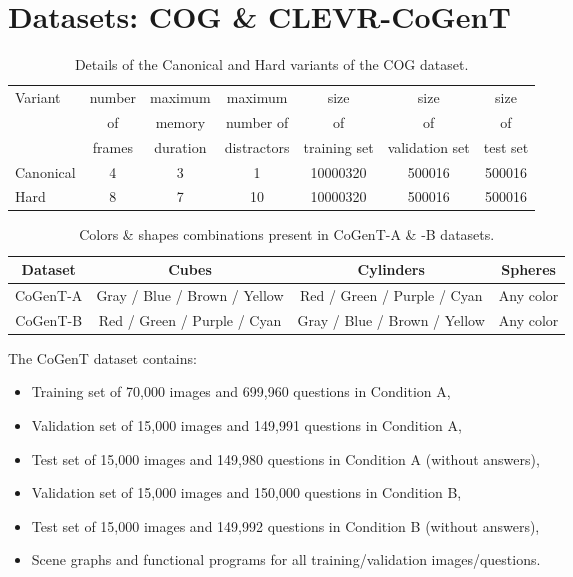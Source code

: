 \section{Datasets: COG \& CLEVR-CoGenT}
\label{sec:datasets-desc}

\begin{table}[ht]
	\centering
	\begin{tabular}{lcccccc}
		\toprule
		Variant    &  	number &  	maximum & maximum & size & size & size  \\ 
		& of   & memory & number of & of & of & of  \\
		& frames & duration & distractors & training set & validation set & test set \\
		\midrule
		Canonical & 4 & 3 & 1 & 10000320 & 500016 & 500016 \\	
		Hard  & 8 & 7 & 10 & 10000320 & 500016  & 500016 \\
		\bottomrule	
	\end{tabular}
	\caption{Details of the Canonical and Hard variants of the COG dataset.}
	\label{tab:cog_variants_supplement}
\end{table}

\begin{table}[ht]
	\centering
	\begin{tabular}{cccc}
		\toprule
		Dataset	&	Cubes	&	Cylinders	&	Spheres	\\
		\midrule
		CoGenT-A	&	Gray / Blue / Brown / Yellow	&	Red / Green / Purple / Cyan	&	Any color	\\
		CoGenT-B	&	Red / Green / Purple / Cyan	&	Gray / Blue / Brown / Yellow	&	Any color 	\\
		\bottomrule
	\end{tabular}
	\caption{Colors \& shapes combinations present in CoGenT-A \& -B datasets.}
    \label{tab:cogent_conditions_supplement}
\end{table}

The CoGenT dataset contains:
\begin{itemize}
	\def\labelitemi{--}
	\item Training set of 70,000 images and 699,960 questions in Condition A,
	\item Validation set of 15,000 images and 149,991 questions in Condition A,
	\item Test set of 15,000 images and 149,980 questions in Condition A (without answers),
	\item Validation set of 15,000 images and 150,000 questions in Condition B,
	\item Test set of 15,000 images and 149,992 questions in Condition B (without answers),
	\item Scene graphs and functional programs for all training/validation images/questions.
\end{itemize}


